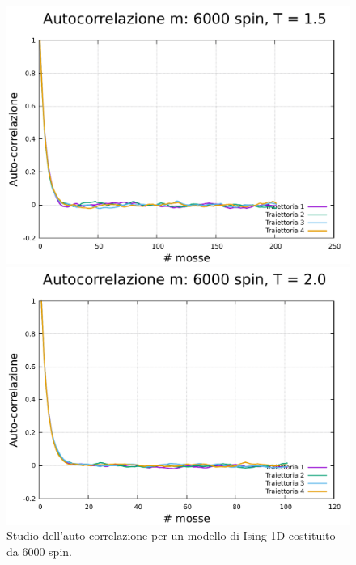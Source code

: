 \begin{figure}[htbp]
    \begin{minipage}{0.45\textwidth}  
      \centering
      \includegraphics[page=1, width=\textwidth]{Immagini/simIsing1D/magn0.02/tcorr/tcorr_6000_1.5.pdf}
      \caption{$T\,=\,1.5$}
    \end{minipage}\hfill
    \begin{minipage}{0.45\textwidth}  
      \centering
      \includegraphics[page=1, width=\textwidth]{Immagini/simIsing1D/magn0.02/tcorr/tcorr_6000_2.0.pdf}
      \caption{$T\,=\,2.0$}
    \end{minipage}
    \caption{Studio dell'auto-correlazione per un modello di Ising 1D costituito da 6000 spin.}
\end{figure}


